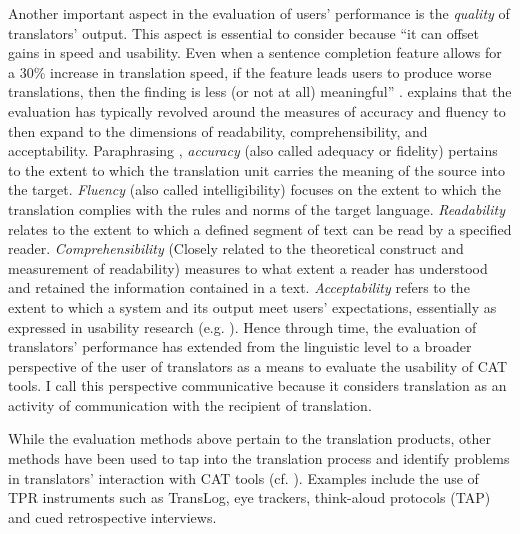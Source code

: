 Another important aspect in the evaluation of users’ performance is the \textit{quality} of translators’ output. This aspect is essential to consider because ``it can offset gains in speed and usability. Even when a sentence completion feature allows for a 30\% increase in translation speed, if the feature leads users to produce worse translations, then the finding is less (or not at all) meaningful'' \citep[375]{laubli2019translation}. \citep[341--342]{laubli2019translation} explains that the evaluation has typically revolved around the measures of accuracy and fluency to then expand to the dimensions of readability, comprehensibility, and acceptability. Paraphrasing \citet[341--342]{laubli2019translation}, \textit{accuracy} (also called adequacy or fidelity) pertains to the extent to which the translation unit carries the meaning of the source into the target. \textit{Fluency} (also called intelligibility) focuses on the extent to which the translation complies with the rules and norms of the target language. \textit{Readability} relates to the extent to which a defined segment of text can be read by a specified reader. \textit{Comprehensibility} (Closely related to the theoretical construct and measurement of readability) measures to what extent a reader has understood and retained the information contained in a text. \textit{Acceptability} refers to the extent to which a system and its output meet users’ expectations, essentially as expressed in usability research (e.g. \cite{nielsen2010}). Hence through time, the evaluation of translators’ performance has extended from the linguistic level to a broader perspective of the user of translators as a means to evaluate the usability of CAT tools. I call this perspective communicative because it considers translation as an activity of communication with the recipient of translation.

While the evaluation methods above pertain to the translation products, other methods have been used to tap into the translation process and identify problems in translators’ interaction with CAT tools (cf. \cite{o2005methodologies}). Examples include the use of TPR instruments such as TransLog, eye trackers, think-aloud protocols (TAP) and cued retrospective interviews.

